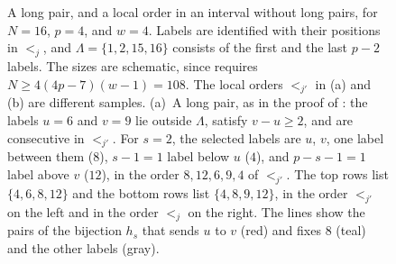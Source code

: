 \documentclass[fontsize=12pt,leading=14pt]{fullpaper}
\begin{document}
\begin{figure}[ht]
  \caption{A long pair, and a local order in an interval without long pairs, for $N=16$, $p=4$, and $w=4$.
    Labels are identified with their positions in $<_j$, and $\Lambda=\{1,2,15,16\}$ consists of the first and the last $p-2$ labels.
    The sizes are schematic, since  requires $N\ge4(4p-7)(w-1)=108$.
    The local orders $<_{j'}$ in (a) and (b) are different samples.
    (a)~A long pair, as in the proof of : the labels $u=6$ and $v=9$ lie outside $\Lambda$, satisfy $v-u\ge2$, and are consecutive in $<_{j'}$.
    For $s=2$, the selected labels are $u$, $v$, one label between them ($8$), $s-1=1$ label below $u$ ($4$), and $p-s-1=1$ label above $v$ ($12$), in the order $8,12,6,9,4$ of $<_{j'}$.
    The top rows list $\{4,6,8,12\}$ and the bottom rows list $\{4,8,9,12\}$, in the order $<_{j'}$ on the left and in the order $<_j$ on the right.
    The lines show the pairs of the bijection $h_s$ that sends $u$ to $v$ (red) and fixes $8$ (teal) and the other labels (gray).
}
\end{figure}
\end{document}
